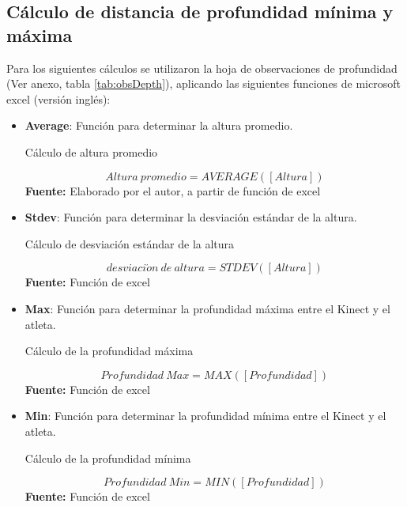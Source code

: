 \subsection{C\'alculo de distancia de profundidad m\'inima y m\'axima} \label{dis:deep}
Para los siguientes c\'alculos se utilizaron la hoja de observaciones de profundidad (Ver anexo, tabla  \ref{tab:obsDepth}), aplicando las siguientes funciones de microsoft excel (versi\'on ingl\'es):
\begin{itemize}
       \item \textbf{Average}: Funci\'on para determinar la altura promedio.
\begin{formula}[H]
	\centering
	\caption{C\'alculo de altura promedio}
	\label{frm:avgHeight}
	\begin{equation}
	Altura \: promedio =AVERAGE([Altura])
	\end{equation}
		\textbf{Fuente:} Elaborado por el autor, a partir de funci\'on de excel
\end{formula}
       \item \textbf{Stdev}: Funci\'on para determinar la desviaci\'on est\'andar de la altura.
\begin{formula}[H]
	\centering
	\caption{C\'alculo de desviaci\'on est\'andar de la altura}
	\label{frm:stdevHeight}
	\begin{equation}
	desviaci\acute{o}n \:  de \: altura =STDEV([Altura])
	\end{equation}
		\textbf{Fuente:} Funci\'on de excel
\end{formula}
       \item \textbf{Max}: Funci\'on para determinar la profundidad m\'axima entre el Kinect y el atleta.
       \begin{formula}[H]
	\centering
	\caption{C\'alculo de la profundidad m\'axima}
	\label{frm:maxDepth}
	\begin{equation}
	Profundidad \: Max =MAX([Profundidad])
	\end{equation}
		\textbf{Fuente:} Funci\'on de excel
\end{formula}
       \item \textbf{Min}: Funci\'on para determinar la profundidad m\'inima entre el Kinect y el atleta.
              \begin{formula}[H]
	\centering
	\caption{C\'alculo de la profundidad m\'inima}
	\label{frm:minDepth}
	\begin{equation}
	Profundidad \:  Min =MIN([Profundidad])
	\end{equation}
		\textbf{Fuente:} Funci\'on de excel
\end{formula}
\end{itemize}
